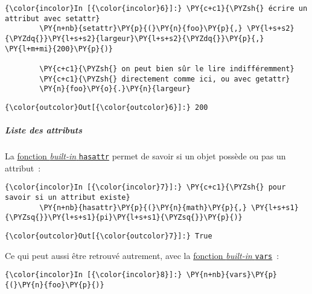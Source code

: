     \begin{Verbatim}[commandchars=\\\{\},frame=single,framerule=0.3mm,rulecolor=\color{cellframecolor}]
{\color{incolor}In [{\color{incolor}6}]:} \PY{c+c1}{\PYZsh{} écrire un attribut avec setattr}
        \PY{n+nb}{setattr}\PY{p}{(}\PY{n}{foo}\PY{p}{,} \PY{l+s+s2}{\PYZdq{}}\PY{l+s+s2}{largeur}\PY{l+s+s2}{\PYZdq{}}\PY{p}{,} \PY{l+m+mi}{200}\PY{p}{)}
        
        \PY{c+c1}{\PYZsh{} on peut bien sûr le lire indifféremment}
        \PY{c+c1}{\PYZsh{} directement comme ici, ou avec getattr}
        \PY{n}{foo}\PY{o}{.}\PY{n}{largeur}
\end{Verbatim}


\begin{Verbatim}[commandchars=\\\{\},frame=single,framerule=0.3mm,rulecolor=\color{cellframecolor}]
{\color{outcolor}Out[{\color{outcolor}6}]:} 200
\end{Verbatim}
            
    \hypertarget{liste-des-attributs}{%
\subparagraph{Liste des attributs}\label{liste-des-attributs}}

    La
\href{https://docs.python.org/3/library/functions.html\#hasattr}{fonction
\emph{built-in} \texttt{hasattr}} permet de savoir si un objet possède
ou pas un attribut~:

    \begin{Verbatim}[commandchars=\\\{\},frame=single,framerule=0.3mm,rulecolor=\color{cellframecolor}]
{\color{incolor}In [{\color{incolor}7}]:} \PY{c+c1}{\PYZsh{} pour savoir si un attribut existe}
        \PY{n+nb}{hasattr}\PY{p}{(}\PY{n}{math}\PY{p}{,} \PY{l+s+s1}{\PYZsq{}}\PY{l+s+s1}{pi}\PY{l+s+s1}{\PYZsq{}}\PY{p}{)}
\end{Verbatim}


\begin{Verbatim}[commandchars=\\\{\},frame=single,framerule=0.3mm,rulecolor=\color{cellframecolor}]
{\color{outcolor}Out[{\color{outcolor}7}]:} True
\end{Verbatim}
            
    Ce qui peut aussi être retrouvé autrement, avec la
\href{https://docs.python.org/3/library/functions.html\#vars}{fonction
\emph{built-in} \texttt{vars}}~:

    \begin{Verbatim}[commandchars=\\\{\},frame=single,framerule=0.3mm,rulecolor=\color{cellframecolor}]
{\color{incolor}In [{\color{incolor}8}]:} \PY{n+nb}{vars}\PY{p}{(}\PY{n}{foo}\PY{p}{)}
\end{Verbatim}


